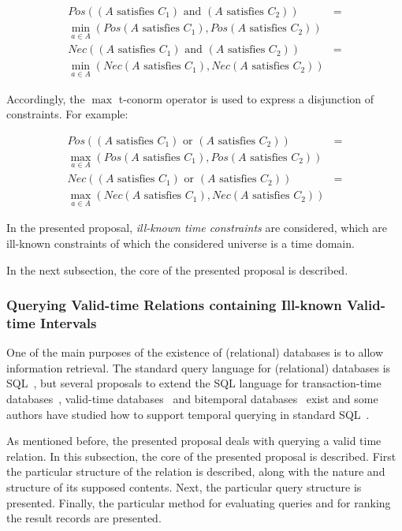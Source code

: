 \begin{align}
Pos((A\text{ satisfies }C_{1}) \text{ and } (A\text{ satisfies }C_{2})) & = \nonumber\\
 \min_{a \in A}(Pos(A\text{ satisfies }C_{1}), Pos(A\text{ satisfies }C_{2})) \nonumber \\
Nec((A\text{ satisfies }C_{1}) \text{ and } (A\text{ satisfies }C_{2})) & = \nonumber\\
 \min_{a \in A}(Nec(A\text{ satisfies }C_{1}), Nec(A\text{ satisfies }C_{2})) \nonumber
\end{align}

Accordingly, the $\max$ t-conorm operator is used to express a disjunction of constraints. For example:

\begin{align}
Pos((A\text{ satisfies }C_{1}) \text{ or } (A\text{ satisfies }C_{2})) & = \nonumber\\
 \max_{a \in A}(Pos(A\text{ satisfies }C_{1}), Pos(A\text{ satisfies }C_{2})) \nonumber \\
Nec((A\text{ satisfies }C_{1}) \text{ or } (A\text{ satisfies }C_{2})) & = \nonumber\\
 \max_{a \in A}(Nec(A\text{ satisfies }C_{1}), Nec(A\text{ satisfies }C_{2})) \nonumber
\end{align}


In the presented proposal, \emph{ill-known time constraints} are considered, which are ill-known constraints of which the considered universe is a time domain.

In the next subsection, the core of the presented proposal is described. 

\subsubsection{Querying Valid-time Relations containing Ill-known Valid-time Intervals}
\label{subsec:querying-time-intervals}

One of the main purposes of the existence of (relational) databases is to allow information retrieval. The standard query language for (relational) databases is SQL~\cite{Mel93}, but several proposals to extend the SQL language for transaction-time databases~\cite{Sarda90}, valid-time databases~\cite{gad92} and bitemporal databases~\cite{TSQL} exist and some authors have studied how to support temporal querying in standard SQL~\cite{Snodgrass98}.

As mentioned before, the presented proposal deals with querying a valid time relation. In this subsection, the core of the presented proposal is described. First the particular structure of the relation is described, along with the nature and structure of its supposed contents. Next, the particular query structure is presented. Finally, the particular method for evaluating queries and for ranking the result records are presented.


